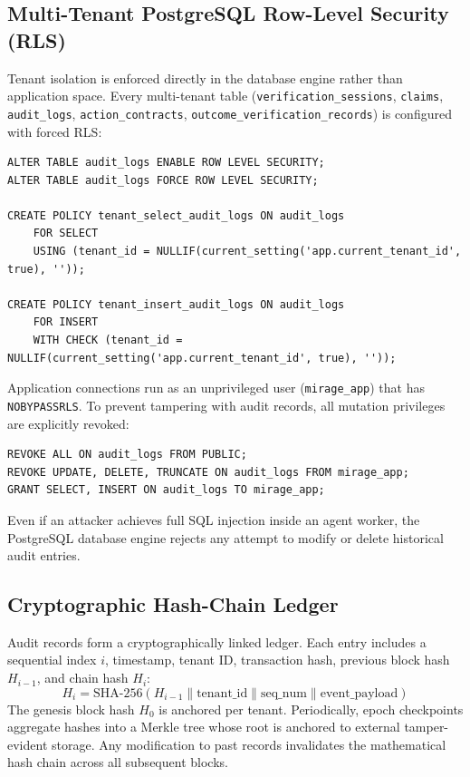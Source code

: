 \documentclass[11pt,a4paper]{article}
\begin{document}
\subsection{Multi-Tenant PostgreSQL Row-Level Security (RLS)}
Tenant isolation is enforced directly in the database engine rather than application space. Every multi-tenant table (\texttt{verification\_sessions}, \texttt{claims}, \texttt{audit\_logs}, \texttt{action\_contracts}, \texttt{outcome\_verification\_records}) is configured with forced RLS:
\begin{verbatim}
ALTER TABLE audit_logs ENABLE ROW LEVEL SECURITY;
ALTER TABLE audit_logs FORCE ROW LEVEL SECURITY;

CREATE POLICY tenant_select_audit_logs ON audit_logs
    FOR SELECT
    USING (tenant_id = NULLIF(current_setting('app.current_tenant_id', true), ''));

CREATE POLICY tenant_insert_audit_logs ON audit_logs
    FOR INSERT
    WITH CHECK (tenant_id = NULLIF(current_setting('app.current_tenant_id', true), ''));
\end{verbatim}
Application connections run as an unprivileged user (\texttt{mirage\_app}) that has \texttt{NOBYPASSRLS}. To prevent tampering with audit records, all mutation privileges are explicitly revoked:
\begin{verbatim}
REVOKE ALL ON audit_logs FROM PUBLIC;
REVOKE UPDATE, DELETE, TRUNCATE ON audit_logs FROM mirage_app;
GRANT SELECT, INSERT ON audit_logs TO mirage_app;
\end{verbatim}
Even if an attacker achieves full SQL injection inside an agent worker, the PostgreSQL database engine rejects any attempt to modify or delete historical audit entries.

\subsection{Cryptographic Hash-Chain Ledger}
Audit records form a cryptographically linked ledger. Each entry includes a sequential index $i$, timestamp, tenant ID, transaction hash, previous block hash $H_{i-1}$, and chain hash $H_i$:
\begin{equation}
  H_i = \text{SHA-256}\left( H_{i-1} \parallel \text{tenant\_id} \parallel \text{seq\_num} \parallel \text{event\_payload} \right)
\end{equation}
The genesis block hash $H_0$ is anchored per tenant. Periodically, epoch checkpoints aggregate hashes into a Merkle tree whose root is anchored to external tamper-evident storage. Any modification to past records invalidates the mathematical hash chain across all subsequent blocks.
\end{document}
